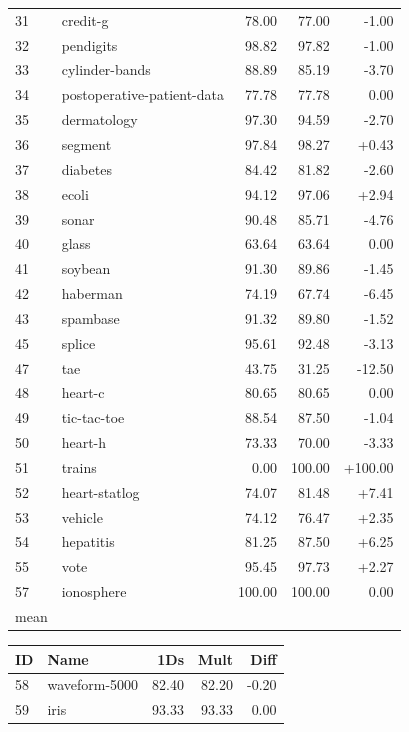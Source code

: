 \documentclass{article}
\begin{document}
\begin{table}[ht]
\begin{tabular}{llrrr}
        31 & credit-g & 78.00 & 77.00 & -1.00 \\
        32 & pendigits & 98.82 & 97.82 & -1.00 \\
        33 & cylinder-bands & 88.89 & 85.19 & -3.70 \\
        34 & postoperative-patient-data & 77.78 & 77.78 & 0.00 \\
        35 & dermatology & 97.30 & 94.59 & -2.70 \\
        36 & segment & 97.84 & 98.27 & +0.43 \\
        37 & diabetes & 84.42 & 81.82 & -2.60 \\
        38 & ecoli & 94.12 & 97.06 & +2.94 \\
        39 & sonar & 90.48 & 85.71 & -4.76 \\
        40 & glass & 63.64 & 63.64 & 0.00 \\
        41 & soybean & 91.30 & 89.86 & -1.45 \\
        42 & haberman & 74.19 & 67.74 & -6.45 \\
        43 & spambase & 91.32 & 89.80 & -1.52 \\
        45 & splice & 95.61 & 92.48 & -3.13 \\
        47 & tae & 43.75 & 31.25 & -12.50 \\
        48 & heart-c & 80.65 & 80.65 & 0.00 \\
        49 & tic-tac-toe & 88.54 & 87.50 & -1.04 \\
        50 & heart-h & 73.33 & 70.00 & -3.33 \\
        51 & trains & 0.00 & 100.00 & +100.00 \\
        52 & heart-statlog & 74.07 & 81.48 & +7.41 \\
        53 & vehicle & 74.12 & 76.47 & +2.35 \\
        54 & hepatitis & 81.25 & 87.50 & +6.25 \\
        55 & vote & 95.45 & 97.73 & +2.27 \\
        57 & ionosphere & 100.00 & 100.00 & 0.00 \\
        \hline
        mean & & & & \\
        \hline
    \end{tabular}
    \begin{tabular}{llrrr}
        \hline
        ID & Name & 1Ds & Mult & Diff \\
        \hline \hline
        58 & waveform-5000 & 82.40 & 82.20 & -0.20 \\
        59 & iris & 93.33 & 93.33 & 0.00 \\

\end{tabular}
\end{table}
\end{document}

